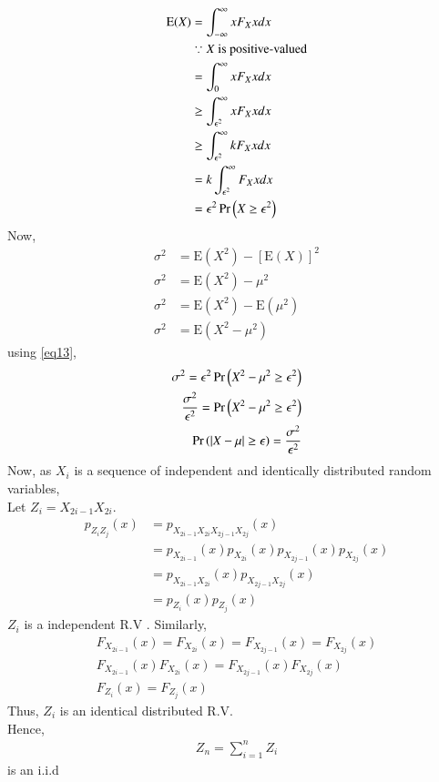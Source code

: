 \documentclass[journal,12pt,Twocolumn]{IEEEtran}
\theoremstyle{remark}
\begin{document}
\begin{align}
\text{E}(X)&=\int_{-\infty}^\infty xF_X{x}dx \\
&\because X \text{ is positive-valued} \\
&=\int_{0}^\infty xF_X{x}dx \\ 
&\geq \int_{\epsilon^2}^\infty xF_X{x}dx \\ 
&\geq \int_{\epsilon^2}^\infty kF_X{x}dx \\
&=k\int_{\epsilon^2}^\infty F_X{x}dx \\
\label{eq13}&=\epsilon^2\Pr\left(X\geq \epsilon^2\right)
\end{align}
Now,
\begin{align}
\sigma^2 &= \text{E}(X^2) - [\text{E}(X)]^2 \\
\sigma^2 &= \text{E}(X^2) - \mu^2 \\
\sigma^2 &= \text{E}(X^2) - \text{E}(\mu^2) \\
\sigma^2 &= \text{E}(X^2-\mu^2)
\end{align}
using \eqref{eq13},
\begin{align}
\sigma^2 = \epsilon^2\Pr\left(X^2-\mu^2\geq \epsilon^2\right) \\
\frac{\sigma^2}{\epsilon^2} = \Pr\left(X^2-\mu^2\geq \epsilon^2\right) \\
\Pr\left(|X-\mu|\geq \epsilon\right) = \frac{\sigma^2}{\epsilon^2} 
\end{align}
Now, as $X_i$ is a sequence of independent and identically distributed random variables, \\
Let $Z_i = X_{2i-1}X_{2i}$. \\ 
\begin{align}
p_{Z_iZ_j}(x)&=p_{X_{2i-1}X_{2i}X_{2j-1}X_{2j}}(x) \\ 
&= p_{X_{2i-1}}(x)p_{X_{2i}}(x)p_{X_{2j-1}}(x)p_{X_{2j}}(x) \\
&= p_{X_{2i-1}X_{2i}}(x)p_{X_{2j-1}X_{2j}}(x) \\
&= p_{Z_i}(x)p_{Z_j}(x)
\end{align}
$Z_i$ is a independent R.V . Similarly,
\begin{align}
F_{X_{2i-1}}(x) = F_{X_{2i}}(x) = F_{X_{2j-1}}(x) = F_{X_{2j}}(x) \\
F_{X_{2i-1}}(x)F_{X_{2i}}(x) = F_{X_{2j-1}}(x)F_{X_{2j}}(x) \\
F_{Z_i}(x) = F_{Z_j}(x)
\end{align}
Thus, $Z_i$ is an identical distributed R.V. \\
Hence,
\begin{align} Z_n=\sum_{i=1}^{n}Z_i 
\end{align} is an i.i.d 
\end{document}
